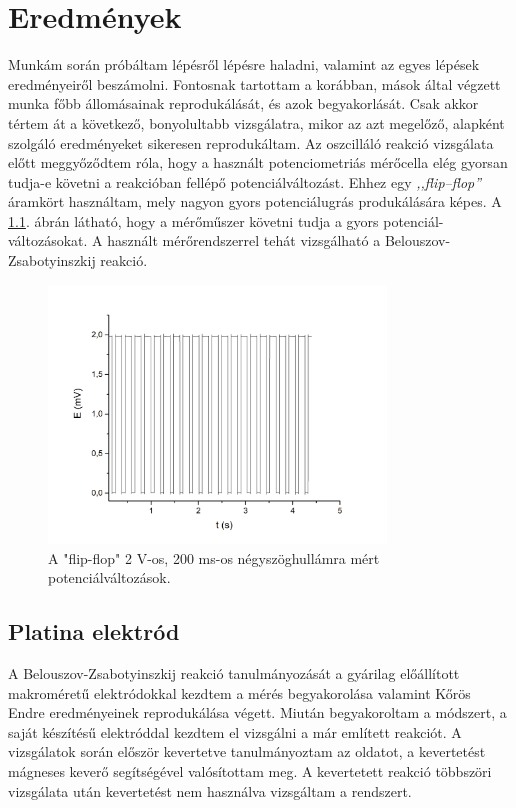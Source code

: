 \chapter{Eredmények}
\pagestyle{headings}

\def\s{0.5}
Munkám során próbáltam lépésről lépésre haladni, valamint az egyes lépések eredményeiről beszámolni. Fontosnak tartottam a korábban, mások által végzett munka főbb állomásainak reprodukálását, és azok begyakorlását. Csak akkor tértem át a következő, bonyolultabb vizsgálatra, mikor az azt megelőző, alapként szolgáló eredményeket sikeresen reprodukáltam. Az oszcilláló reakció vizsgálata előtt meggyőződtem róla, hogy a használt potenciometriás mérőcella elég gyorsan tudja-e követni a reakcióban fellépő potenciálváltozást. Ehhez egy \emph{,,flip--flop''} áramkört használtam, mely nagyon gyors potenciálugrás produkálására képes. A \ref{fig:square}. ábrán látható, hogy a mérőműszer követni tudja a gyors potenciál-változásokat. A használt mérőrendszerrel tehát vizsgálható a Belouszov-Zsabotyinszkij reakció.

\begin{figure}[!h]
\centering
\includegraphics[width=0.8\textwidth]{img/square.jpg}
\caption{A "flip-flop" 2 V-os, 200 ms-os négyszöghullámra mért potenciálváltozások.}
\label{fig:square}
\end{figure}

\section{Platina elektród}
A Belouszov-Zsabotyinszkij reakció tanulmányozását a gyárilag előállított makroméretű elektródokkal kezdtem a mérés begyakorolása valamint Kőrös Endre eredményeinek \cite{noyes1972oscillations} reprodukálása végett. Miután begyakoroltam a módszert, a saját készítésű elektróddal kezdtem el vizsgálni a már említett reakciót. A vizsgálatok során először kevertetve tanulmányoztam az oldatot, a kevertetést mágneses keverő segítségével valósítottam meg. A kevertetett reakció többszöri vizsgálata után kevertetést nem használva vizsgáltam a rendszert.

